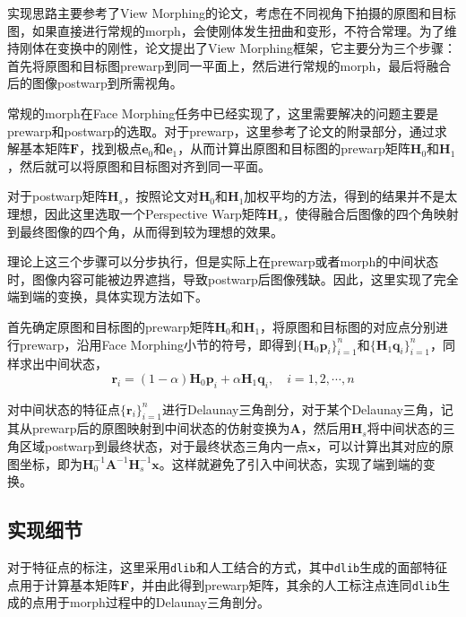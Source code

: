 \documentclass[12pt,a4paper]{article}
\begin{document}
实现思路主要参考了View Morphing的论文\cite{seitz1996view}，考虑在不同视角下拍摄的原图和目标图，如果直接进行常规的morph，会使刚体发生扭曲和变形，不符合常理。为了维持刚体在变换中的刚性，论文提出了View Morphing框架，它主要分为三个步骤：首先将原图和目标图prewarp到同一平面上，然后进行常规的morph，最后将融合后的图像postwarp到所需视角。

常规的morph在Face Morphing任务中已经实现了，这里需要解决的问题主要是prewarp和postwarp的选取。对于prewarp，这里参考了论文的附录部分，通过求解基本矩阵$\mathbf{F}$，找到极点$\mathbf{e}_0$和$\mathbf{e}_1$，从而计算出原图和目标图的prewarp矩阵$\mathbf{H}_0$和$\mathbf{H}_1$，然后就可以将原图和目标图对齐到同一平面。

对于postwarp矩阵$\mathbf{H}_s$，按照论文对$\mathbf{H}_0$和$\mathbf{H}_1$加权平均的方法，得到的结果并不是太理想，因此这里选取一个Perspective Warp矩阵$\mathbf{H}_s$，使得融合后图像的四个角映射到最终图像的四个角，从而得到较为理想的效果。

理论上这三个步骤可以分步执行，但是实际上在prewarp或者morph的中间状态时，图像内容可能被边界遮挡，导致postwarp后图像残缺。因此，这里实现了完全端到端的变换，具体实现方法如下。

首先确定原图和目标图的prewarp矩阵$\mathbf{H}_0$和$\mathbf{H}_1$，将原图和目标图的对应点分别进行prewarp，沿用Face Morphing小节的符号，即得到$\{\mathbf{H}_0 \mathbf{p}_i\}_{i=1}^n$和$\{\mathbf{H}_1 \mathbf{q}_i\}_{i=1}^n$，同样求出中间状态，
\begin{equation}
    \mathbf{r}_i = (1-\alpha)\mathbf{H}_0 \mathbf{p}_i + \alpha \mathbf{H}_1 \mathbf{q}_i, \quad i = 1,2,\cdots,n
\end{equation}

对中间状态的特征点$\{\mathbf{r}_i\}_{i=1}^n$进行Delaunay三角剖分，对于某个Delaunay三角，记其从prewarp后的原图映射到中间状态的仿射变换为$\mathbf{A}$，然后用$\mathbf{H}_s$将中间状态的三角区域postwarp到最终状态，对于最终状态三角内一点$\mathbf{x}$，可以计算出其对应的原图坐标，即为$\mathbf{H}_0^{-1}\mathbf{A}^{-1}\mathbf{H}_s^{-1}\mathbf{x}$。这样就避免了引入中间状态，实现了端到端的变换。

\subsection{实现细节}

对于特征点的标注，这里采用\texttt{dlib}和人工结合的方式，其中\texttt{dlib}生成的面部特征点用于计算基本矩阵$\mathbf{F}$，并由此得到prewarp矩阵，其余的人工标注点连同\texttt{dlib}生成的点用于morph过程中的Delaunay三角剖分。
\end{document}
